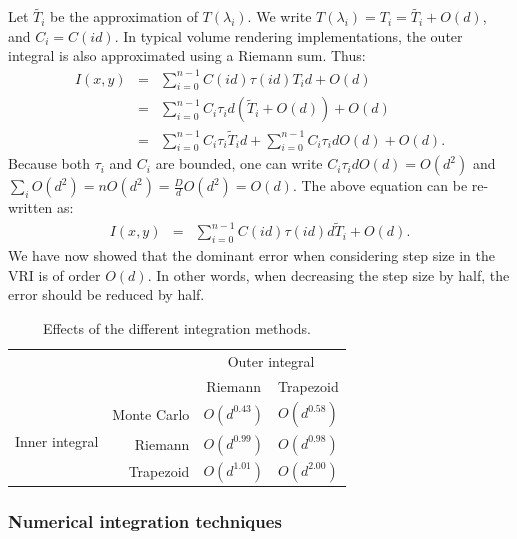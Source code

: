 Let $\tilde{T_i}$ be the approximation of $T(\lambda_i)$. We write
$T(\lambda_i) = T_i = \tilde{T_i} + O(d)$, and $C_i = C(id)$.  
%
In typical volume rendering implementations, the outer integral is
also approximated using a Riemann sum. Thus:
\begin{eqnarray}
I(x,y) &=& \sum_{i=0} ^ {n-1} C(i d) \tau(i d) T_i d + O(d)\\
&=& \sum_{i=0}^{n-1} C_i \tau_i d \left(\tilde{T}_{i} + O(d)\right) + O(d)\\
&=& \sum_{i=0}^{n-1} C_i \tau_i \tilde{T}_{i} d + \sum_{i=0}^{n-1} C_i \tau_i d O(d) + O(d).
\end{eqnarray}
Because both $\tau_i$ and $C_i$ are bounded, one can write $C_i \tau_i d O(d) = O(d^2)$ and $\sum_i O(d^2) = n O(d^2) = \frac{D}{d}O(d^2) = O(d)$. The above equation can be re-written as:
\begin{eqnarray}
I(x,y)  &=& \sum_{i=0} ^ {n-1} C(i d) \tau(i d) d \tilde{T}_{i} + O(d).
\end{eqnarray}
We have now showed that the dominant error when considering step size
in the VRI is of order $O(d)$. In other words, when decreasing the step size by half, the
error should be reduced by half.


\begin{table}[b]
\normalsize
  \caption{Effects of the different integration methods.}
  \centering
  \begin{tabular}{c  r | c c }
  & & \multicolumn{2}{c}{Outer integral}\\
   &                & Riemann & Trapezoid  \\
    \hline
\multirow{3}{*}{\parbox{1cm}{Inner \mbox{integral}}} & Monte Carlo & $ O(d^{0.43}) $ & $ O(d^{0.58})$ \\
& Riemann      & $ O(d^{0.99}) $ & $ O(d^{0.98}) $ \\
&Trapezoid     & $ O(d^{1.01}) $ & $ O(d^{2.00})$ \\
    \hline  
  \end{tabular} 
  \label{table:orders} 
\end{table}

\subsubsection{Numerical integration techniques}

